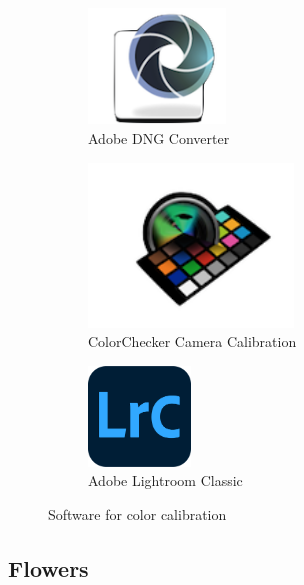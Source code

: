 \documentclass[10pt,letter,english]{article}
\begin{document}
\begin{figure}[H]
\centering
\begin{subfigure}[t]{.33\textwidth}
  \centering
  \includegraphics[width=0.4\textwidth]{Figures/logo Adobe DNG Converter.png}
  \caption{Adobe DNG Converter}
  \label{}
\end{subfigure}%
\begin{subfigure}[t]{.33\textwidth}
  \centering
  \includegraphics[width=0.6\textwidth]{Figures/logo ColorChecker Camera Calibration.png}
  \caption{ColorChecker Camera Calibration}
  \label{}
\end{subfigure}
\begin{subfigure}[t]{.33\textwidth}
  \centering
  \includegraphics[width=0.3\textwidth]{Figures/logo Lrc.png}
  \caption{Adobe Lightroom Classic}
  \label{}
\end{subfigure}
\caption{Software for color calibration}
\label{}
\end{figure}



\subsection{Flowers}
\end{document}
